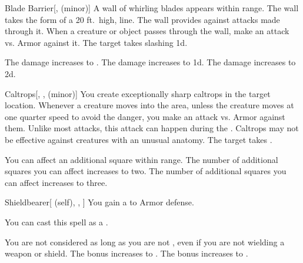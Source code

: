 \lowercase{\hypertarget{spell:Blade Barrier}{}}\label{spell:Blade Barrier}
\begin{freeability}[Rank 2]{\hypertarget{spell:Blade Barrier}{Blade Barrier}}[,  (minor)]
A wall of whirling blades appears within \rngmed range.
The wall takes the form of a 20 ft.\ high, \arealarge line.
The wall provides  against attacks made through it.
When a creature or object passes through the wall, make an attack vs. Armor against it.
\hit The target takes slashing  \minus1d.

\rankline
{} The damage increases to .
 The damage increases to  \plus1d.
 The damage increases to  \plus2d.

\end{freeability}
\vspace{0.25em}



\lowercase{\hypertarget{spell:Caltrops}{}}\label{spell:Caltrops}
\begin{freeability}[Rank 2]{\hypertarget{spell:Caltrops}{Caltrops}}[, ,  (minor)]
You create exceptionally sharp caltrops in the target location.
Whenever a creature moves into the area, unless the creature moves at one quarter speed to avoid the danger, you make an attack vs. Armor against them.
Unlike most attacks, this attack can happen during the .
Caltrops may not be effective against creatures with an unusual anatomy.
\hit The target takes .

\rankline
{} You can affect an additional square within range.
 The number of additional squares you can affect increases to two.
 The number of additional squares you can affect increases to three.

\end{freeability}
\vspace{0.25em}



\lowercase{\hypertarget{spell:Shieldbearer}{}}\label{spell:Shieldbearer}
\begin{attuneability}[Rank 2]{\hypertarget{spell:Shieldbearer}{Shieldbearer}}[ (self), , ]
You gain a   to Armor defense.

You can cast this spell as a .

\rankline
{} You are not considered  as long as you are not , even if you are not wielding a weapon or shield.
 The bonus increases to .
 The bonus increases to .

\end{attuneability}
\vspace{0.25em}



